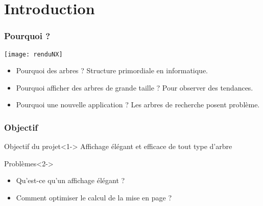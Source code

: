 \section{Introduction}

\begin{frame}
	\frametitle{Pourquoi ?}
	\begin{center}
		\texttt{[image: renduNX]} \\
		\begin{itemize}
			\item Pourquoi des arbres ? Structure primordiale en informatique. 
			\item Pourquoi afficher des arbres de grande taille ? Pour observer des tendances. %
			\item Pourquoi une nouvelle application ? Les arbres de recherche posent problème.
		\end{itemize}
	\end{center}
\end{frame}

\begin{frame}
	\frametitle{Objectif}
	\begin{block}{Objectif du projet}<1->
		Affichage élégant et efficace de tout type d'arbre
	\end{block}
	\begin{alertblock}{Problèmes}<2->
		\begin{itemize}
			\item Qu'est-ce qu'un affichage élégant ?
			\item Comment optimiser le calcul de la mise en page ?
		\end{itemize}
	\end{alertblock}
\end{frame}


